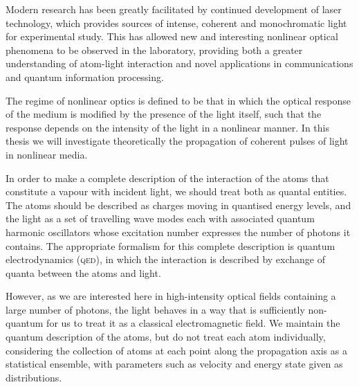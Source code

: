     Modern research has been greatly facilitated by continued development of
    laser technology, which provides sources of intense, coherent and
    monochromatic light for experimental study. This has allowed new and
    interesting nonlinear optical phenomena to be observed in the laboratory,
    providing both a greater understanding of atom-light interaction and novel
    applications in communications\cite{Kimble2008} and quantum information
    processing\cite{Lvovsky2009}.

    The regime of nonlinear optics is defined to be that in which the optical
    response of the medium is modified by the presence of the light itself, such
    that the response depends on the intensity of the light in a nonlinear
    manner.\cite{boyd2008nonlinear} In this thesis we will investigate
    theoretically the propagation of coherent pulses of light in nonlinear
    media.



    In order to make a complete description of the interaction of the atoms that
    constitute a vapour with incident light, we should treat both as quantal
    entities. The atoms should be described as charges moving in quantised
    energy levels, and the light as a set of travelling wave modes each with
    associated quantum harmonic oscillators whose excitation number expresses
    the number of photons it contains.\cite{scully1997quantum} The appropriate
    formalism for this complete description is quantum electrodynamics
    (\textsc{qed}), in which the interaction is described by exchange of quanta
    between the atoms and light.

    However, as we are interested here in high-intensity optical fields
    containing a large number of photons, the light behaves in a way that is
    sufficiently non-quantum for us to treat it as a classical electromagnetic
    field.\cite{jackson1998classical} We maintain the quantum description of the
    atoms, but do not treat each atom individually, considering the collection
    of atoms at each point along the propagation axis as a statistical ensemble,
    with parameters such as velocity and energy state given as distributions.

